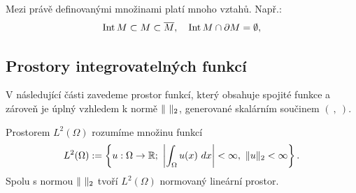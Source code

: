 Mezi právě definovanými množinami platí mnoho vztahů. Např.:
\[ \operatorname{Int} M\subset M \subset \overline M, \quad \operatorname{Int} M\cap \partial M = \emptyset, \]


% 
% 
% 





\subsection{Prostory integrovatelných funkcí}

V následující části zavedeme prostor funkcí, který obsahuje spojité funkce a zároveň je úplný vzhledem k normě $\|\ \|_2$, generované skalárním součinem $(\ ,\ )$.

\begin{df}
\label{df:Lp}
Prostorem $L^2(\Omega)$ rozumíme množinu funkcí
\[ L^2(\Omega):=\left\{u:\Omega\rightarrow\mathbb R;~\left|\int_\Omega u(x)~dx\right|<\infty,~\|u\|_2<\infty \right\}. \]
Spolu s normou $\|\ \|_2$ tvoří $L^2(\Omega)$ normovaný lineární prostor.
\end{df}

